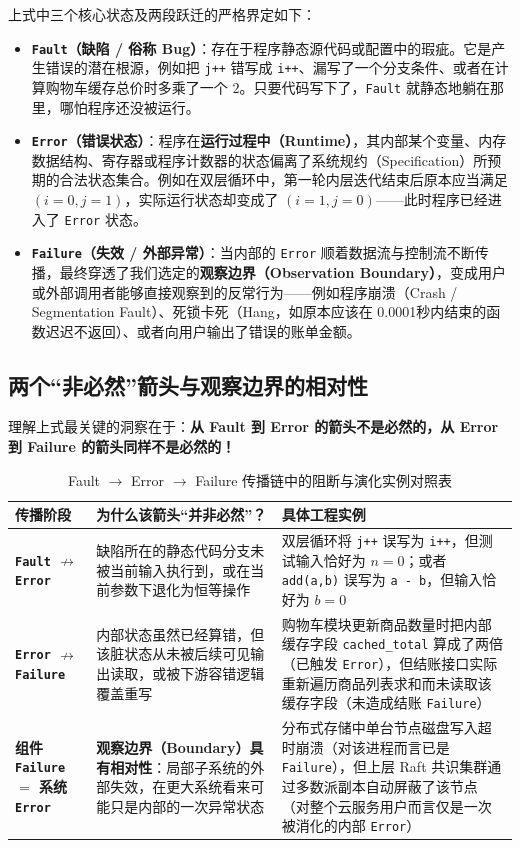 \documentclass[a4paper]{article}
\begin{document}
上式中三个核心状态及两段跃迁的严格界定如下：
\begin{itemize}
    \item \textbf{\texttt{Fault}（缺陷 / 俗称 Bug）}：存在于程序静态源代码或配置中的瑕疵。它是产生错误的潜在根源，例如把 \texttt{j++} 错写成 \texttt{i++}、漏写了一个分支条件、或者在计算购物车缓存总价时多乘了一个 $2$。只要代码写下了，\texttt{Fault} 就静态地躺在那里，哪怕程序还没被运行。
    \item \textbf{\texttt{Error}（错误状态）}：程序在\textbf{运行过程中（Runtime）}，其内部某个变量、内存数据结构、寄存器或程序计数器的状态偏离了系统规约（Specification）所预期的合法状态集合。例如在双层循环中，第一轮内层迭代结束后原本应当满足 $(i=0, j=1)$，实际运行状态却变成了 $(i=1, j=0)$——此时程序已经进入了 \texttt{Error} 状态。
    \item \textbf{\texttt{Failure}（失效 / 外部异常）}：当内部的 \texttt{Error} 顺着数据流与控制流不断传播，最终穿透了我们选定的\textbf{观察边界（Observation Boundary）}，变成用户或外部调用者能够直接观察到的反常行为——例如程序崩溃（Crash / Segmentation Fault）、死锁卡死（Hang，如原本应该在 0.0001秒内结束的函数迟迟不返回）、或者向用户输出了错误的账单金额。
\end{itemize}

\subsection{两个“非必然”箭头与观察边界的相对性}

理解上式最关键的洞察在于：\textbf{从 Fault 到 Error 的箭头不是必然的，从 Error 到 Failure 的箭头同样不是必然的！}

\begin{table}[H]
\centering
\small
\caption{Fault $\to$ Error $\to$ Failure 传播链中的阻断与演化实例对照表}
\begin{tabular}{p{3.2cm}p{4.8cm}p{5.2cm}}
\toprule
\textbf{传播阶段} & \textbf{为什么该箭头“并非必然”？} & \textbf{具体工程实例} \\
\midrule
\textbf{\texttt{Fault} $\nrightarrow$ \texttt{Error}} & 缺陷所在的静态代码分支未被当前输入执行到，或在当前参数下退化为恒等操作 & 双层循环将 \texttt{j++} 误写为 \texttt{i++}，但测试输入恰好为 $n = 0$；或者 \texttt{add(a,b)} 误写为 \texttt{a - b}，但输入恰好为 $b = 0$ \\
\textbf{\texttt{Error} $\nrightarrow$ \texttt{Failure}} & 内部状态虽然已经算错，但该脏状态从未被后续可见输出读取，或被下游容错逻辑覆盖重写 & 购物车模块更新商品数量时把内部缓存字段 \texttt{cached\_total} 算成了两倍（已触发 \texttt{Error}），但结账接口实际重新遍历商品列表求和而未读取该缓存字段（未造成结账 \texttt{Failure}） \\
\textbf{组件 \texttt{Failure} $=$ 系统 \texttt{Error}} & \textbf{观察边界（Boundary）具有相对性}：局部子系统的外部失效，在更大系统看来可能只是内部的一次异常状态 & 分布式存储中单台节点磁盘写入超时崩溃（对该进程而言已是 \texttt{Failure}），但上层 Raft 共识集群通过多数派副本自动屏蔽了该节点（对整个云服务用户而言仅是一次被消化的内部 \texttt{Error}） \\
\bottomrule
\end{tabular}
\end{table}
\end{document}
